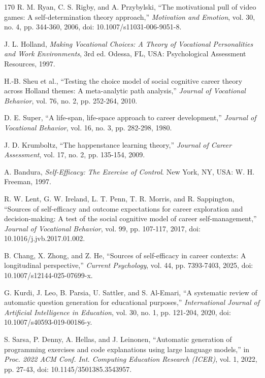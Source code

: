 \begin{thebibliography}{170}
 R. M. Ryan, C. S. Rigby, and A. Przybylski, ``The motivational pull of video games: A self-determination theory approach,'' \textit{Motivation and Emotion}, vol. 30, no. 4, pp. 344-360, 2006, doi: 10.1007/s11031-006-9051-8.

 J. L. Holland, \textit{Making Vocational Choices: A Theory of Vocational Personalities and Work Environments}, 3rd ed. Odessa, FL, USA: Psychological Assessment Resources, 1997.

 H.-B. Sheu et al., ``Testing the choice model of social cognitive career theory across Holland themes: A meta-analytic path analysis,'' \textit{Journal of Vocational Behavior}, vol. 76, no. 2, pp. 252-264, 2010.

 D. E. Super, ``A life-span, life-space approach to career development,'' \textit{Journal of Vocational Behavior}, vol. 16, no. 3, pp. 282-298, 1980.

 J. D. Krumboltz, ``The happenstance learning theory,'' \textit{Journal of Career Assessment}, vol. 17, no. 2, pp. 135-154, 2009.

 A. Bandura, \textit{Self-Efficacy: The Exercise of Control}. New York, NY, USA: W. H. Freeman, 1997.

 R. W. Lent, G. W. Ireland, L. T. Penn, T. R. Morris, and R. Sappington, ``Sources of self-efficacy and outcome expectations for career exploration and decision-making: A test of the social cognitive model of career self-management,'' \textit{Journal of Vocational Behavior}, vol. 99, pp. 107-117, 2017, doi: 10.1016/j.jvb.2017.01.002.

 B. Chang, X. Zhong, and Z. He, ``Sources of self-efficacy in career contexts: A longitudinal perspective,'' \textit{Current Psychology}, vol. 44, pp. 7393-7403, 2025, doi: 10.1007/s12144-025-07699-x.

 G. Kurdi, J. Leo, B. Parsia, U. Sattler, and S. Al-Emari, ``A systematic review of automatic question generation for educational purposes,'' \textit{International Journal of Artificial Intelligence in Education}, vol. 30, no. 1, pp. 121-204, 2020, doi: 10.1007/s40593-019-00186-y.

 S. Sarsa, P. Denny, A. Hellas, and J. Leinonen, ``Automatic generation of programming exercises and code explanations using large language models,'' in \textit{Proc. 2022 ACM Conf. Int. Computing Education Research (ICER)}, vol. 1, 2022, pp. 27-43, doi: 10.1145/3501385.3543957.


\end{thebibliography}
